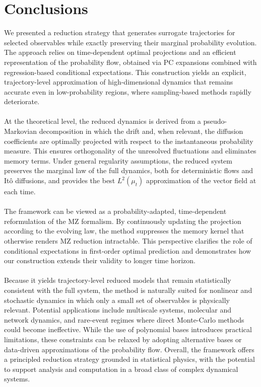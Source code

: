 \documentclass[11pt, a4paper, oneside, reqno]{amsart}
\begin{document}
\section{Conclusions}\label{sec:conclusions}
\noindent We presented a reduction strategy that generates surrogate trajectories for selected observables while exactly preserving their marginal probability evolution. The approach relies on time-dependent optimal projections and an efficient representation of the probability flow, obtained via PC expansions combined with regression-based conditional expectations. This construction yields an explicit, trajectory-level approximation of high-dimensional dynamics that remains accurate even in low-probability regions, where sampling-based methods rapidly deteriorate. \\ \ \\
At the theoretical level, the reduced dynamics is derived from a pseudo-Markovian decomposition in which the drift and, when relevant, the diffusion coefficients are optimally projected with respect to the instantaneous probability measure. This ensures orthogonality of the unresolved fluctuations and eliminates memory terms. Under general regularity assumptions, the reduced system preserves the marginal law of the full dynamics, both for deterministic flows and Itô diffusions, and provides the best $L^2(\mu_t)$ approximation of the vector field at each time. \\ \ \\
The framework can be viewed as a probability-adapted, time-dependent reformulation of the MZ formalism. By continuously updating the projection according to the evolving law, the method suppresses the memory kernel that otherwise renders MZ reduction intractable. This perspective clarifies the role of conditional expectations in first-order optimal prediction and demonstrates how our construction extends their validity to longer time horizon.
\\ \ \\
Because it yields trajectory-level reduced models that remain statistically consistent with the full system, the method is naturally suited for nonlinear and stochastic dynamics in which only a small set of observables is physically relevant. Potential applications include multiscale systems, molecular and network dynamics, and rare-event regimes where direct Monte-Carlo methods could become ineffective. While the use of polynomial bases introduces practical limitations, these constraints can be relaxed by adopting alternative bases or data-driven approximations of the probability flow. Overall, the framework offers a principled reduction strategy grounded in statistical physics, with the potential to support analysis and computation in a broad class of complex dynamical systems.
\end{document}
